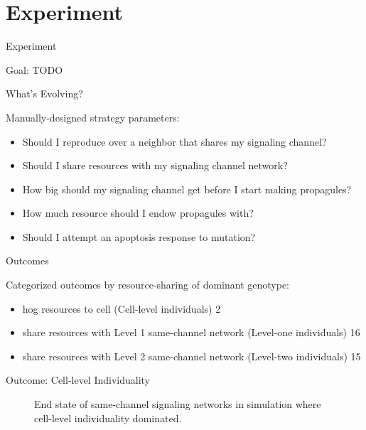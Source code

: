 \section{Experiment}

\begin{frame}{Experiment}

Goal: TODO

\end{frame}

\begin{frame}{What's Evolving?}

Manually-designed strategy parameters:
\begin{itemize}
\item Should I reproduce over a neighbor that shares my signaling channel?
\item Should I share resources with my signaling channel network?
\item How big should my signaling channel get before I start making propagules?
\item How much resource should I endow propagules with?
\item Should I attempt an apoptosis response to mutation?
\end{itemize}
\end{frame}

\begin{frame}{Outcomes}

Categorized outcomes by resource-sharing of dominant genotype:
\begin{itemize}
\item hog resources to cell (Cell-level individuals) 2
\item share resources with Level 1 same-channel network (Level-one individuals) 16
\item share resources with Level 2 same-channel network (Level-two individuals) 15
\end{itemize}

\end{frame}

\begin{frame}{Outcome: Cell-level Individuality}
\begin{figure}
\begin{columns}
\begin{column}{0.6\textwidth}
\end{column}
\begin{column}{0.4\textwidth}
\caption{
End state of same-channel signaling networks in simulation where cell-level individuality dominated.
}
\end{column}
\end{columns}
\end{figure}
\end{frame}

